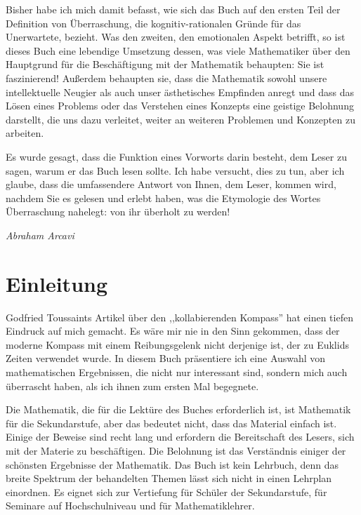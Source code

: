 Bisher habe ich mich damit befasst, wie sich das Buch auf den ersten Teil der Definition von Überraschung, die kognitiv-rationalen Gründe für das Unerwartete, bezieht. Was den zweiten, den emotionalen Aspekt betrifft, so ist dieses Buch eine lebendige Umsetzung dessen, was viele Mathematiker über den Hauptgrund für die Beschäftigung mit der Mathematik behaupten: Sie ist faszinierend! Außerdem behaupten sie, dass die Mathematik sowohl unsere intellektuelle Neugier als auch unser ästhetisches Empfinden anregt und dass das Lösen eines Problems oder das Verstehen eines Konzepts eine geistige Belohnung darstellt, die uns dazu verleitet, weiter an weiteren Problemen und Konzepten zu arbeiten. 

Es wurde gesagt, dass die Funktion eines Vorworts darin besteht, dem Leser zu sagen, warum er das Buch lesen sollte. Ich habe versucht, dies zu tun, aber ich glaube, dass die umfassendere Antwort von Ihnen, dem Leser, kommen wird, nachdem Sie es gelesen und erlebt haben, was die Etymologie des Wortes Überraschung nahelegt: von ihr überholt zu werden!

\vspace{\baselineskip}
\begin{flushright}
\textit{Abraham Arcavi}
\end{flushright}

\chapter*{Einleitung}

Godfried Toussaints Artikel über den ,,kollabierenden Kompass'' hat einen tiefen Eindruck auf mich gemacht. Es wäre mir nie in den Sinn gekommen, dass der moderne Kompass mit einem Reibungsgelenk nicht derjenige ist, der zu Euklids Zeiten verwendet wurde. In diesem Buch präsentiere ich eine Auswahl von mathematischen Ergebnissen, die nicht nur interessant sind, sondern mich auch überrascht haben, als ich ihnen zum ersten Mal begegnete.

Die Mathematik, die für die Lektüre des Buches erforderlich ist, ist Mathematik für die Sekundarstufe, aber das bedeutet nicht, dass das Material einfach ist. Einige der Beweise sind recht lang und erfordern die Bereitschaft des Lesers, sich mit der Materie zu beschäftigen. Die Belohnung ist das Verständnis einiger der schönsten Ergebnisse der Mathematik. Das Buch ist kein Lehrbuch, denn das breite Spektrum der behandelten Themen lässt sich nicht in einen Lehrplan einordnen. Es eignet sich zur Vertiefung für Schüler der Sekundarstufe, für Seminare auf Hochschulniveau und für Mathematiklehrer.

